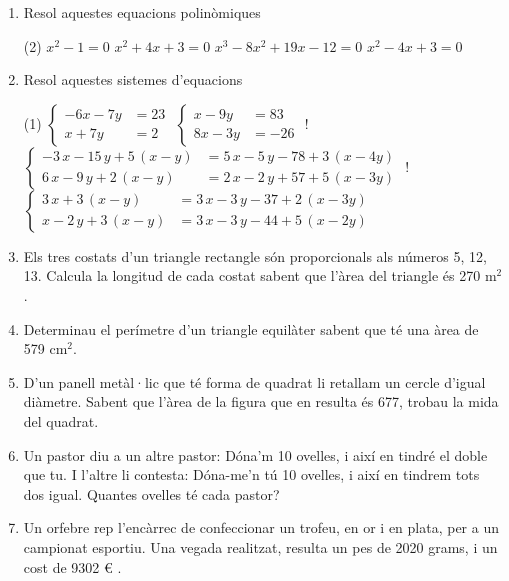 \documentclass[a4paper]{article}
\begin{document}
\begin{enumerate}[resume]
  
      \item Resol aquestes equacions polinòmiques
      \begin{tasks}(2)
        \task $ x^{2}  -1 =0$
        \task $ x^{2} + 4 x + 3 =0$
        \task $ x^{3} -8 x^{2} + 19 x -12 =0$
        \task $ x^{2} -4 x + 3 =0$
      \end{tasks}
      \item Resol aquestes sistemes d'equacions
      \begin{tasks}(1)
        \task $\left\{ \begin{array}{ll}  -6 x-7 y&=23\\x + 7 y&=2\end{array} \right.$
        \task $\left\{ \begin{array}{ll}  x-9 y&=83\\8 x-3 y&=-26\end{array} \right.$
        \task! $\left\{ \begin{array}{ll}  -3\,  x-15\,  y + 5 \,  (x-y)&=5\,  x-5\,  y-78 + 3 \,  (x-4y )\\6\,  x-9\,  y + 2 \,  (x-y)&=2\,  x-2\,  y+57 + 5\,  (x-3y )\end{array} \right.$
        \task! $\left\{ \begin{array}{ll}  3\,  x + 3 \,  (x-y)&=3\,  x-3\,  y-37 + 2 \,  (x-3y )\\x-2\,  y + 3 \,  (x-y)&=3\,  x-3\,  y-44 + 5 \,  (x-2y )\end{array} \right.$
      \end{tasks}
      \item Els tres costats d'un triangle rectangle són proporcionals als números 5, 12, 13. Calcula la longitud de cada costat sabent que l'àrea del triangle és 270 m$^2$.
      \item Determinau el perímetre d'un triangle equilàter sabent que té una àrea de 579 cm$^2$.
      \item D'un panell metàl·lic que té forma de quadrat li retallam un cercle d'igual diàmetre. Sabent que l'àrea de la figura que en resulta és 677, trobau la mida del quadrat.
      \item  Un pastor diu a un altre pastor: Dóna'm 10 ovelles, i així en tindré el doble que tu. I
                      l'altre li contesta: Dóna-me'n tú 10 ovelles, i així en tindrem tots dos igual. Quantes ovelles
                      té cada pastor?
      \item Un orfebre rep l'encàrrec de confeccionar un trofeu, en or i en plata, per a un
                      campionat esportiu. Una vegada realitzat, resulta un pes de 2020 grams, i un cost de 9302 \euro{} .

\end{enumerate}
\end{document}
